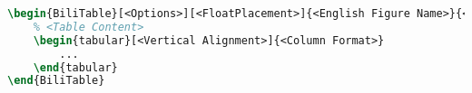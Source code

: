 \begin{lstlisting}[language=LaTeX, label=listing:bilingual-table]
\begin{BiliTable}[<Options>][<FloatPlacement>]{<English Figure Name>}{<中文图名>}
    % <Table Content>
    \begin{tabular}[<Vertical Alignment>]{<Column Format>}
        ...
    \end{tabular}
\end{BiliTable}
\end{lstlisting}